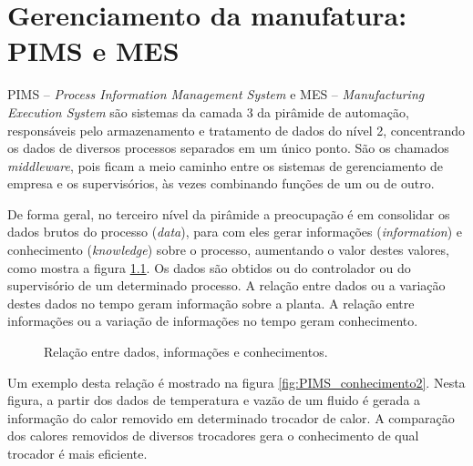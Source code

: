 \chapter{Gerenciamento da manufatura: PIMS e MES}

 PIMS -- \emph{Process Information Management System} e MES -- \emph{Manufacturing Execution System} são sistemas da camada 3 da pirâmide de automação, responsáveis pelo armazenamento e tratamento de dados do nível 2, concentrando os dados de diversos processos separados em um único ponto. São os chamados \emph{middleware}, pois ficam a meio caminho entre os sistemas de gerenciamento de empresa e os supervisórios, às vezes combinando funções de um ou de outro.

 De forma geral, no terceiro nível da pirâmide a preocupação é em consolidar os dados brutos do processo (\emph{data}), para com eles gerar informações  (\emph{information}) e conhecimento (\emph{knowledge}) sobre o processo, aumentando o valor destes valores, como mostra a figura \ref{fig:PIMS_conhecimento1}. Os dados são obtidos ou do controlador ou do supervisório de um determinado processo. A relação entre dados ou a variação destes dados no tempo geram informação sobre a planta. A relação entre informações ou a variação de informações no tempo geram conhecimento.
\begin{figure}[htb]
	\begin{center}

	\end{center}
	\caption{Relação entre dados, informações e conhecimentos.}
	\label{fig:PIMS_conhecimento1}
\end{figure}

Um exemplo desta relação é mostrado na figura \ref{fig:PIMS_conhecimento2}. Nesta figura, a partir dos dados de temperatura e vazão de um fluido é gerada a informação do calor removido em determinado trocador de calor. A comparação dos calores removidos de diversos trocadores gera o conhecimento de qual trocador é mais eficiente.

